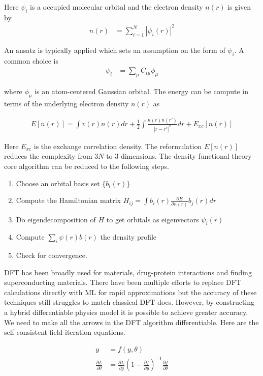 \documentclass[book.tex]{subfiles}
\begin{document}
Here $\psi_i$ is a occupied molecular orbital and the electron density $n(r)$ is given by
\begin{align}
    n(r) &= \sum_{i=1}^N |\psi_i(r)|^2
\end{align}

An ansatz is typically applied which sets an assumption on the form of $\psi_i$. A common choice is 
\begin{align}
    \psi_i &= \sum_{\mu} C_{i\mu} \phi_\mu
\end{align}

where $\phi_\mu$ is an atom-centered Gaussian orbital. The energy can be compute in terms of the underlying electron density $n(r)$ as

\begin{align}
    E[n(r)] = \int v(r)n(r) dr + \frac{1}{2} \int \frac{n(r)n(r')}{|r - r'|^2} dr + E_{xc}[n(r)]
\end{align}

Here $E_{xc}$ is the exchange correlation density. The reformulation $E[n(r)]$ reduces the complexity from $3N$ to $3$ dimensions. The density functional theory core algorithm can be reduced to the following steps.

\begin{enumerate}
    \item Choose an orbital basis set $\{b_i(r)\}$
    \item Compute the Hamiltonian matrix $H_{ij} = \int b_i(r) \frac{\partial E}{\partial n(r)} b_j(r) dr$
    \item Do eigendecomposition of $H$ to get orbitals as eigenvectors $\psi_i(r)$
    \item Compute $\sum_i \psi(r) b(r)$ the density profile
    \item Check for convergence.
\end{enumerate}

DFT has been broadly used for materials, drug-protein interactions and finding superconducting materials. There have been multiple efforts to replace DFT calculations directly with ML for rapid approximations but the accuracy of these techniques still struggles to match classical DFT does. However, by constructing a hybrid differentiable physics model it is possible to achieve greater accuracy. We need to make all the arrows in the DFT algorithm differentiable. Here are the self consistent field iteration equations.

\begin{align}
y &= f(y, \theta) \\
\frac{\partial L}{\partial \theta} &= \frac{\partial L}{\partial y} \left ( 1 - \frac{\partial f}{\partial y} \right )^{-1} \frac{\partial f}{\partial \theta}
\end{align}
\end{document}
